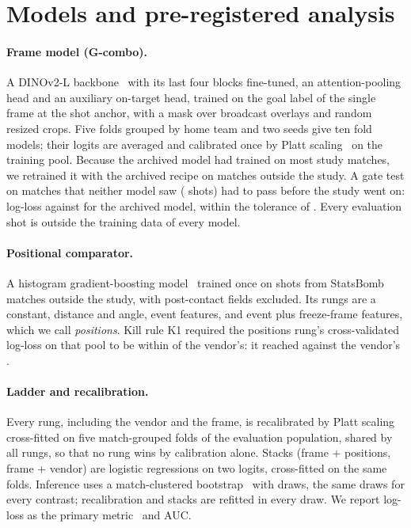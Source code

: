 \documentclass[10pt,twocolumn,letterpaper]{article}
\begin{document}
\section{Models and pre-registered analysis}
\label{sec:method}

\paragraph{Frame model (G-combo).} A DINOv2-L backbone~\cite{oquab2024dinov2} with its last four blocks fine-tuned,
an attention-pooling head and an auxiliary on-target head, trained on the goal label of the single frame at the shot
anchor, with a mask over broadcast overlays and random resized crops. Five folds grouped by home team and two seeds
give ten fold models; their logits are averaged and calibrated once by Platt scaling~\cite{platt1999probabilistic} on the training
pool. Because the archived model had trained on most study matches, we retrained it with the archived recipe on
 matches outside the study. A gate test on  matches that neither model saw
( shots) had to pass before the study went on: log-loss  against  for the
archived model, within the tolerance of . Every evaluation shot is outside the training data of every
model.

\paragraph{Positional comparator.} A histogram gradient-boosting model~\cite{friedman2001greedy,pedregosa2011sklearn}
trained once on  shots from  StatsBomb matches outside the study, with
post-contact fields excluded. Its rungs are a constant, distance and angle, event features, and event plus freeze-frame
features, which we call \emph{positions}. Kill rule K1 required the positions rung's cross-validated log-loss on that
pool to be within  of the vendor's: it reached  against the vendor's .

\paragraph{Ladder and recalibration.} Every rung, including the vendor and the frame, is recalibrated by Platt scaling
cross-fitted on five match-grouped folds of the evaluation population, shared by all rungs, so that no rung wins by
calibration alone. Stacks (frame + positions, frame + vendor) are logistic regressions on two logits, cross-fitted on
the same folds. Inference uses a match-clustered bootstrap~\cite{field2007bootstrapping} with  draws,
the same draws for every contrast; recalibration and stacks are refitted in every draw. We report log-loss as the
primary metric~\cite{gneiting2007scoring} and AUC.
\end{document}
